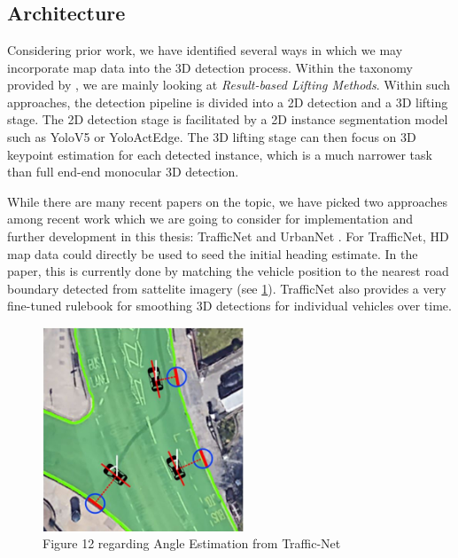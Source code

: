 \documentclass[RAIstudentexpose%
              ,optBibtex%
              ,optBibstyleAlphabetic%
              ,optEnglish%
              ]{RAIlatex}%
\begin{document}
\section{}

\subsection{Architecture}

Considering prior work, we have identified several ways in which we may incorporate map data into the 3D detection process. Within the taxonomy provided by \cite{survey2022}, we are mainly looking at \textit{Result-based Lifting Methods}. Within such approaches, the detection pipeline is divided into a 2D detection and a 3D lifting stage. The 2D detection stage is facilitated by a 2D instance segmentation model such as YoloV5 or YoloActEdge. The 3D lifting stage can then focus on 3D keypoint estimation for each detected instance, which is a much narrower task than full end-end monocular 3D detection. \par

While there are many recent papers on the topic, we have picked two approaches among recent work which we are going to consider for implementation and further development in this thesis: TrafficNet \cite{trafficnet2021} and UrbanNet \cite{urbannet2021}. For TrafficNet, HD map data could directly be used to seed the initial heading estimate. In the paper, this is currently done by matching the vehicle position to the nearest road boundary detected from sattelite imagery (see \cref{fig:tranet-road-edge}). TrafficNet also provides a very fine-tuned rulebook for smoothing 3D detections for individual vehicles over time. \par

\begin{figure}[htb]%
    \centering
    \includegraphics[width=60mm]{angle-estimation}
    \caption{Figure 12 regarding Angle Estimation from Traffic-Net \cite{trafficnet2021}}
    \label{fig:tranet-road-edge}%
\end{figure}%
\end{document}
